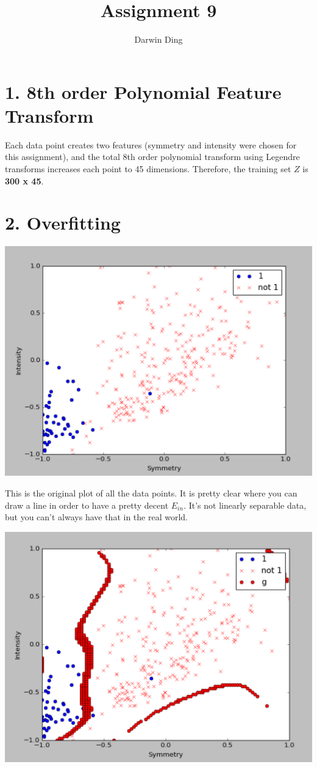 \documentclass[12pt]{article}
\begin{document}
\title{Assignment 9}
\author{Darwin Ding}
\maketitle

\section*{1. 8th order Polynomial Feature Transform}
Each data point creates two features (symmetry and intensity were chosen for this assignment), and the total 8th order polynomial transform using Legendre transforms increases each point to 45 dimensions. Therefore, the training set $Z$ is \textbf{300 x 45}.

\section*{2. Overfitting}
\includegraphics[scale=.5]{2-2.png}

This is the original plot of all the data points. It is pretty clear where you can draw a line in order to have a pretty decent $E_{in}$. It's not linearly separable data, but you can't always have that in the real world.

\includegraphics[scale=.5]{2-1.png}
\end{document}
